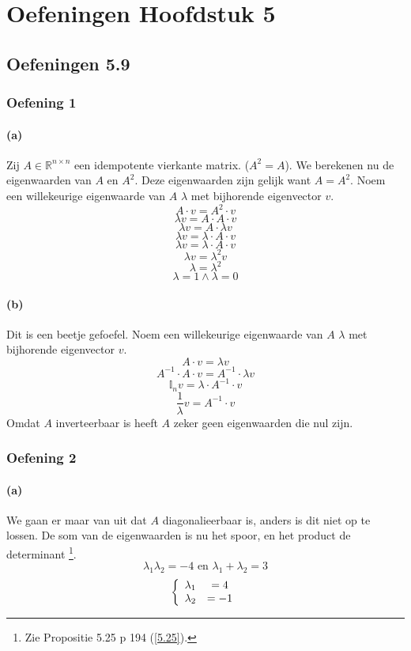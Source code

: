 \documentclass[lineaire_algebra_oplossingen.tex]{subfiles}
\begin{document}
\chapter{Oefeningen Hoofdstuk 5}

\section{Oefeningen 5.9}
\subsection{Oefening 1}
\subsubsection*{(a)}
Zij $A \in \mathbb{R}^{n\times n}$ een idempotente vierkante matrix. ($A^2 = A$).
We berekenen nu de eigenwaarden van $A$ en $A^2$. Deze eigenwaarden zijn gelijk want $A= A^2$. Noem een willekeurige eigenwaarde van $A$ $\lambda$ met bijhorende eigenvector $v$.
\[
A\cdot v = A^2\cdot v
\]
\[
\lambda v = A \cdot A \cdot v
\]
\[
\lambda v = A \cdot \lambda v
\]
\[
\lambda v = \lambda \cdot A \cdot v
\]
\[
\lambda v = \lambda \cdot A \cdot v
\]
\[
\lambda v = \lambda^2 v
\]
\[
\lambda = \lambda^2
\]
\[
\lambda = 1 \wedge \lambda = 0
\]

\subsubsection*{(b)}
Dit is een beetje gefoefel. Noem een willekeurige eigenwaarde van $A$ $\lambda$ met bijhorende eigenvector $v$.
\[
A \cdot v = \lambda v
\]
\[
A^{-1} \cdot A \cdot v = A^{-1}\cdot \lambda v
\]
\[
\mathbb{I}_n v = \lambda \cdot A^{-1}\cdot v
\]
\[
\frac{1}{\lambda} v = A^{-1} \cdot v
\]
Omdat $A$ inverteerbaar is heeft $A$ zeker geen eigenwaarden die nul zijn.

\subsection{Oefening 2}
\subsubsection*{(a)}
We gaan er maar van uit dat $A$ diagonalieerbaar is, anders is dit niet op te lossen.
De som van de eigenwaarden is nu het spoor, en het product de determinant \footnote{Zie Propositie 5.25 p 194 (\ref{5.25}).}. 
\[
\lambda_1 \lambda_2 = -4 \text{ en } \lambda_1 + \lambda_2 = 3
\]
\[
\left\{
\begin{array}{c c}
\lambda_1 &= 4\\
\lambda_2 &= -1\\
\end{array}
\right.
\]
\end{document}
